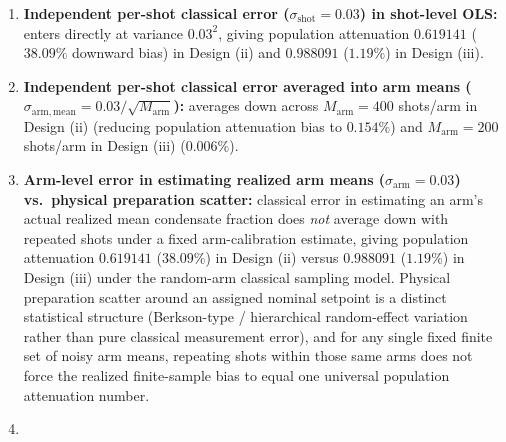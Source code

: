 \documentclass[
  american,
  11pt,
  letterpaper,
]{article}
\providecommand{\tightlist}{%
  \setlength{\itemsep}{0pt}\setlength{\parskip}{0pt}}
\begin{document}
\begin{enumerate}
\def\labelenumi{\arabic{enumi}.}
\tightlist
\item
  \textbf{Independent per-shot classical error (\(\sigma_{\mathrm{shot}} = 0.03\)) in shot-level OLS:} enters directly at variance \(0.03^2\), giving population attenuation \(0.619141\) (\(38.09\%\) downward bias) in Design (ii) and \(0.988091\) (\(1.19\%\)) in Design (iii).
\item
  \textbf{Independent per-shot classical error averaged into arm means (\(\sigma_{\mathrm{arm,mean}} = 0.03/\sqrt{M_{\mathrm{arm}}}\)):} averages down across \(M_{\mathrm{arm}} = 400\) shots/arm in Design (ii) (reducing population attenuation bias to \(0.154\%\)) and \(M_{\mathrm{arm}} = 200\) shots/arm in Design (iii) (\(0.006\%\)).
\item
  \textbf{Arm-level error in estimating realized arm means (\(\sigma_{\mathrm{arm}} = 0.03\)) vs.~physical preparation scatter:} classical error in estimating an arm's actual realized mean condensate fraction does \emph{not} average down with repeated shots under a fixed arm-calibration estimate, giving population attenuation \(0.619141\) (\(38.09\%\)) in Design (ii) versus \(0.988091\) (\(1.19\%\)) in Design (iii) under the random-arm classical sampling model. Physical preparation scatter around an assigned nominal setpoint is a distinct statistical structure (Berkson-type / hierarchical random-effect variation rather than pure classical measurement error), and for any single fixed finite set of noisy arm means, repeating shots within those same arms does not force the realized finite-sample bias to equal one universal population attenuation number.
\item

\end{enumerate}
\end{document}
